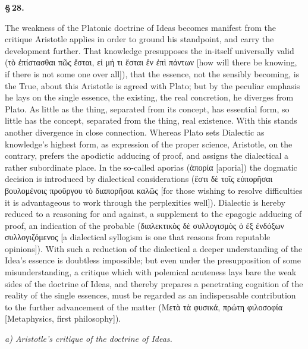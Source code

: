 \documentclass[12pt]{book}
\begin{document}
\begin{center}{\bfseries \S\,28.}\end{center}

The weakness of the Platonic doctrine of Ideas becomes manifest from the critique Aristotle applies in
order to ground his standpoint, and carry the development further. That knowledge presupposes the
in-itself universally valid (τὸ ἐπίστασθαι πῶς ἔσται, εἰ μή τι ἔσται ἓν ἐπὶ πάντων [how will there be
knowing, if there is not some one over all]), that the essence, not the sensibly becoming, is the True,
about this Aristotle is agreed with Plato; but by the peculiar emphasis he lays on the single essence,
the existing, the real concretion, he diverges from Plato. As little as the thing, separated from its
concept, has essential form, so little has the concept, separated from the thing, real existence. With
this stands another divergence in close connection. Whereas Plato sets Dialectic as knowledge's highest
form, as expression of the proper science, Aristotle, on the contrary, prefers the
apodictic adducing of proof, and assigns the dialectical a rather subordinate place. In the so-called
aporias (ἀπορία [aporia]) the dogmatic decision is introduced by dialectical considerations (ἔστι δὲ
τοῖς εὐπορῆσαι βουλομένοις προὔργου τὸ διαπορῆσαι καλῶς [for those wishing to resolve difficulties it
is advantageous to work through the perplexities well]). Dialectic is hereby reduced to a reasoning for
and against, a supplement to the epagogic adducing of proof, an indication of the probable (διαλεκτικὸς
δὲ συλλογισμὸς ὁ ἐξ ἐνδόξων συλλογιζόμενος [a dialectical syllogism is one that reasons from reputable
opinions]). With such a reduction of the dialectical a deeper understanding of the Idea's essence is
doubtless impossible; but even under the presupposition of some misunderstanding, a critique which with
polemical acuteness lays bare the weak sides of the doctrine of Ideas, and thereby prepares a
penetrating cognition of the reality of the single essences, must be regarded as an indispensable
contribution to the further advancement of the matter (Μετὰ τὰ φυσικά, πρώτη φιλοσοφία [Metaphysics,
first philosophy]).

\emph{a) Aristotle's critique of the doctrine of Ideas.}
\end{document}
